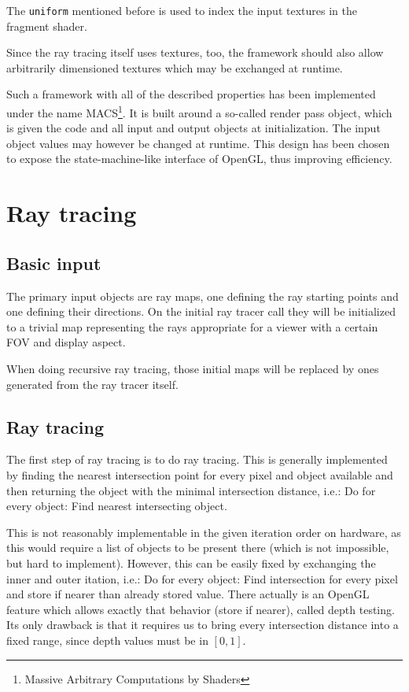 \documentclass[english,fleqn,10pt,twocolumn]{article}
\begin{document}
The {\tt uniform} mentioned before is used to index the input textures in the fragment shader.

Since the ray tracing itself uses textures, too, the framework should also allow arbitrarily dimensioned textures which may be exchanged at runtime.

Such a framework with all of the described properties has been implemented under the name MACS\footnote{Massive Arbitrary Computations by Shaders}. It is built around a so-called render pass object, which is given the code and all
input and output objects at initialization. The input object values may however be changed at runtime. This design has been chosen to expose the state-machine-like interface of OpenGL, thus improving efficiency.


\section{Ray tracing}

\subsection{Basic input}

The primary input objects are ray maps, one defining the ray starting points and one defining their directions. On the initial ray tracer call they will be initialized to a trivial map representing the rays appropriate for a viewer with
a certain FOV and display aspect.

When doing recursive ray tracing, those initial maps will be replaced by ones generated from the ray tracer itself.

\subsection{Ray tracing}

The first step of ray tracing is to do ray tracing. This is generally implemented by finding the nearest intersection point for every pixel and object available and then returning the object with the minimal intersection distance,
i.e.: Do for every object: Find nearest intersecting object.

This is not reasonably implementable in the given iteration order on hardware, as this would require a list of objects to be present there (which is not impossible, but hard to implement). However, this can be easily fixed by exchanging
the inner and outer itation, i.e.: Do for every object: Find intersection for every pixel and store if nearer than already stored value. There actually is an OpenGL feature which allows exactly that behavior (store if nearer), called
depth testing. Its only drawback is that it requires us to bring every intersection distance into a fixed range, since depth values must be in $[0, 1]$.
\end{document}
